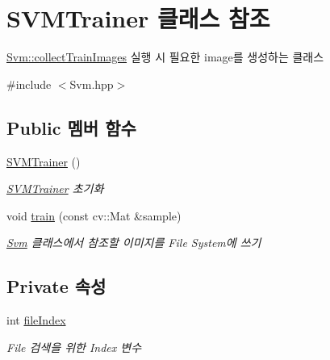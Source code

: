 \hypertarget{class_s_v_m_trainer}{}\section{S\+V\+M\+Trainer 클래스 참조}
\label{class_s_v_m_trainer}


\hyperlink{class_svm_a1b18e97fffb268f9cfe91152f7e96298}{Svm\+::collect\+Train\+Images} 실행 시 필요한 image를 생성하는 클래스  




{\ttfamily \#include $<$Svm.\+hpp$>$}

\subsection*{Public 멤버 함수}
\begin{DoxyCompactItemize}
\item 
\mbox{\label{class_s_v_m_trainer_a2109fcf47792fe25ac12e14368c775bb}} 
\hyperlink{class_s_v_m_trainer_a2109fcf47792fe25ac12e14368c775bb}{S\+V\+M\+Trainer} ()
\begin{DoxyCompactList}\small\item\em \hyperlink{class_s_v_m_trainer}{S\+V\+M\+Trainer} 초기화 \end{DoxyCompactList}\item 
void \hyperlink{class_s_v_m_trainer_a60f3eb8020709966c067246c98b610c4}{train} (const cv\+::\+Mat \&sample)
\begin{DoxyCompactList}\small\item\em \hyperlink{class_svm}{Svm} 클래스에서 참조할 이미지를 File System에 쓰기 \end{DoxyCompactList}\end{DoxyCompactItemize}
\subsection*{Private 속성}
\begin{DoxyCompactItemize}
\item 
\mbox{\label{class_s_v_m_trainer_ad7ac47f8d93360bac934cf399f37b967}} 
int \hyperlink{class_s_v_m_trainer_ad7ac47f8d93360bac934cf399f37b967}{file\+Index}
\begin{DoxyCompactList}\small\item\em File 검색을 위한 Index 변수 \end{DoxyCompactList}\end{DoxyCompactItemize}


